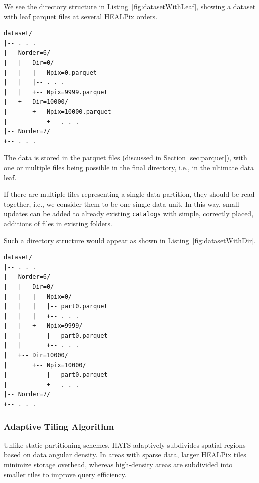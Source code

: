 \documentclass[11pt,a4paper]{ivoa}
\begin{document}
We see the directory structure in Listing~\ref{fig:datasetWithLeaf}, showing a dataset with leaf parquet files at several HEALPix orders.

\begin{minipage}{\linewidth}
\begin{lstlisting}[caption=Example catalog dataset directory contents, label=fig:datasetWithLeaf]
dataset/
|-- . . .
|-- Norder=6/
|   |-- Dir=0/
|   |   |-- Npix=0.parquet
|   |   |-- . . .
|   |   +-- Npix=9999.parquet
|   +-- Dir=10000/
|       +-- Npix=10000.parquet
|           +-- . . .
|-- Norder=7/
+-- . . .
\end{lstlisting} 
\end{minipage}

The data is stored in the parquet files (discussed in Section \ref{sec:parquet}), with one or multiple files being possible in the final directory, i.e., in the ultimate data leaf.  \par 
If there are multiple files representing a single data partition, they should be read together, i.e., we consider them to be one single data unit. 
In this way, small updates can be added to already existing  \texttt{catalogs} with simple, correctly placed, additions of files in existing folders.

Such a directory structure would appear as shown in Listing~\ref{fig:datasetWithDir}.

\begin{minipage}{\linewidth}
\begin{lstlisting}[caption=Example catalog dataset directory contents with leaf directories, label=fig:datasetWithDir]
dataset/
|-- . . .
|-- Norder=6/
|   |-- Dir=0/
|   |   |-- Npix=0/
|   |   |   |-- part0.parquet
|   |   |   +-- . . .
|   |   +-- Npix=9999/
|   |       |-- part0.parquet
|   |       +-- . . .
|   +-- Dir=10000/
|       +-- Npix=10000/
|           |-- part0.parquet
|           +-- . . .
|-- Norder=7/
+-- . . .
\end{lstlisting} 
\end{minipage} 

\subsubsection{Adaptive Tiling Algorithm} \label{sec:adaptive}
Unlike static partitioning schemes, HATS adaptively subdivides spatial regions based on data angular density. 
In areas with sparse data, larger HEALPix tiles minimize storage overhead, whereas high-density areas are subdivided into smaller tiles to improve query efficiency. \par
\end{document}
